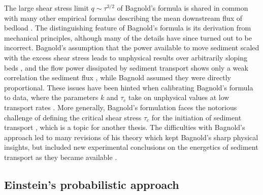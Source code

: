 The large shear stress limit $q \sim \tau^{3/2}$ of Bagnold's formula is shared in common with many other empirical formulas describing the mean downstream flux of bedload \citep[e.g.][]{MeyerPeter1948, Yalin1972, Wilcock2003, Parker1998}. The distinguishing feature of Bagnold's formula is its derivation from mechanical principles, although many of the details have since turned out to be incorrect. Bagnold's assumption that the power available to move sediment scaled with the excess shear stress leads to unphysical results over arbitrarily sloping beds \citep{Seminara2002}, and the flow power dissipated by sediment transport shows only a weak correlation the sediment flux \citep{Ancey2008}, while Bagnold assumed they were directly proportional. These issues have been hinted when calibrating Bagnold's formula to data, where the parameters $k$ and $\tau_c$ take on unphysical values at low transport rates \citep{Nino1996}.
More generally, Bagnold's formulation faces the notorious challenge of defining the critical shear stress $\tau_c$ for the initiation of sediment transport \citep{Paintal1971,Kirchener1990,Houssais2015,Clark2017,Allen2018}, which is a topic for another thesis. 
The difficulties with Bagnold's approach led to many revisions of his theory which kept Bagnold's sharp physical insights, but included new experimental conclusions on the energetics of sediment transport as they became available \citep{Engelund1976,Luque1976,Nino1998,Martin2000}.

\subsection{Einstein's probabilistic approach}

